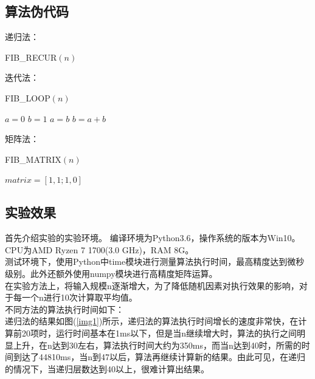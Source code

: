 \documentclass[UTF8]{ctexart}
\begin{document}
\subsection{算法伪代码}

递归法：
\begin{algorithm}[H]
	\caption{FIB\_RECUR$(n)$}%
    \begin{algorithmic}[1]%
        \ENDIF
	\end{algorithmic}
\end{algorithm}

迭代法：
\begin{algorithm}[H]
	\caption{FIB\_LOOP$(n)$}%
	\begin{algorithmic}[1]%
        \STATE $a = 0$
        \STATE $b = 1$
		\STATE $a = b$
		\STATE $b = a + b$
        \ENDFOR
	\end{algorithmic}
\end{algorithm}

矩阵法：
\begin{algorithm}[H]
	\caption{FIB\_MATRIX$(n)$}%
	\begin{algorithmic}[1]%
		\STATE $matrix = [1,1 ; 1,0]$
	\end{algorithmic}
\end{algorithm}


\subsection{实验效果}
首先介绍实验的实验环境。
编译环境为Python3.6，操作系统的版本为Win10。
CPU为AMD Ryzen 7 1700(3.0 GHz)，RAM 8G。\\
测试环境下，使用Python中time模块进行测量算法执行时间，最高精度达到微秒级别。此外还额外使用numpy模块进行高精度矩阵运算。\\
在实验方法上，将输入规模n逐渐增大，为了降低随机因素对执行效果的影响，对于每一个n进行10次计算取平均值。\\

不同方法的算法执行时间如下：\\
递归法的结果如图(\ref{img1})所示，递归法的算法执行时间增长的速度非常快，在计算前20项时，运行时间基本在1ms以下，但是当n继续增大时，算法的执行之间明显上升，在n达到30左右，算法执行时间大约为350ms，而当n达到40时，所需的时间到达了44810ms，当n到47以后，算法再继续计算新的结果。由此可见，在递归的情况下，当递归层数达到40以上，很难计算出结果。\\
\end{document}
